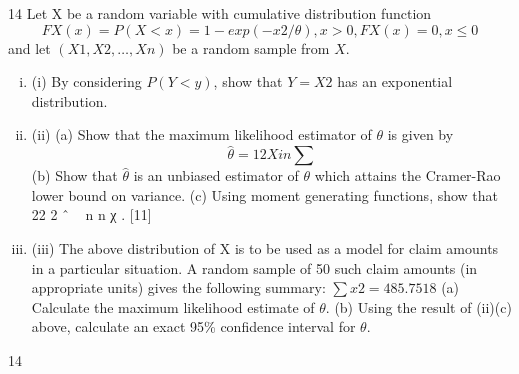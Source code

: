 \documentclass[a4paper,12pt]{article}
\begin{document}
14 Let X be a random variable with cumulative distribution function
\[FX(x) = P(X < x) = 1 − exp(−x2/\theta) , x > 0 , FX(x) = 0 , x ≤ 0\]
and let $(X1, X2, … , Xn)$ be a random sample from $X$.
\begin{enumerate}[(i)]
\item (i) By considering $P(Y < y)$, show that $Y = X2$ has an exponential distribution.

\item (ii) (a) Show that the maximum likelihood estimator of $\theta$ is given by
\[\hat{\theta}
= 1 2
Xi
n
\sum \]
(b) Show that $\hat{\theta}$ is an unbiased estimator of $\theta$ which attains the
Cramer-Rao lower bound on variance.
(c) Using moment generating functions, show that 22
2 ˆ ~ n
n \theta χ
\theta
. [11]
\item (iii) The above distribution of X is to be used as a model for claim amounts in
a particular situation. A random sample of 50 such claim amounts (in
appropriate units) gives the following summary:
$\sum x2 = 485.7518$
(a) Calculate the maximum likelihood estimate of $\theta$.
(b) Using the result of (ii)(c) above, calculate an exact 95\% confidence interval for $\theta$.

\end{enumerate}

\newpage

14 
\end{document}
